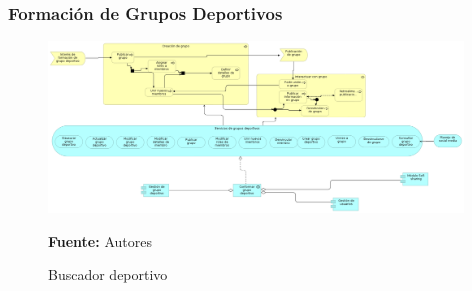 \subsubsection{Formación de Grupos Deportivos}

\begin{figure}[!htb]
  \begin{center}
    \includegraphics[width=11cm]{./imagenes/application_usage/formaciongruposdeportivos.png}
    \caption{Buscador deportivo}
    \label{fig:BF_BuscadorDeportivo}
    \textbf{Fuente:}  Autores
  \end{center}
\end{figure}

